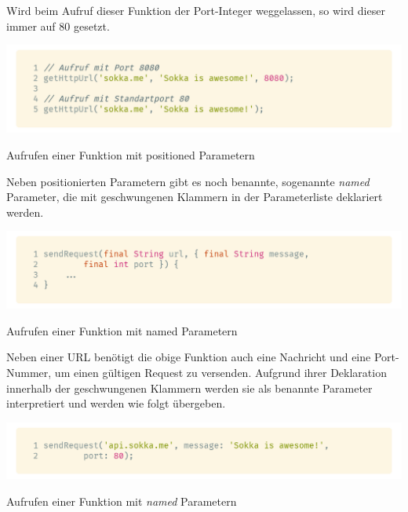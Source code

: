\newpage

Wird beim Aufruf dieser Funktion der Port-Integer weggelassen, so wird dieser immer auf 80 gesetzt.

\begin{code}
    \centering
    \includegraphics[width=1\textwidth]{images/Dart/theory/dartCallPositionedFunction.png}
    \vspace{-25pt}
    \caption{Aufrufen einer Funktion mit positioned Parametern}
\end{code}

Neben positionierten Parametern gibt es noch \glqq benannte\grqq , sogenannte \textit{named} Parameter, die mit geschwungenen Klammern in der Parameterliste deklariert werden.

\begin{code}[H]
    \centering
    \includegraphics[width=1\textwidth]{images/Dart/theory/dartNamedArguments.png}
    \vspace{-25pt}
    \caption{Aufrufen einer Funktion mit named Parametern}
\end{code}

Neben einer URL benötigt die obige Funktion auch eine Nachricht und eine Port-Nummer, um einen gültigen Request zu versenden. Aufgrund ihrer Deklaration innerhalb der geschwungenen Klammern
werden sie als benannte Parameter interpretiert und werden wie folgt übergeben.

\begin{code}[H]
    \centering
    \includegraphics[width=1\textwidth]{images/Dart/theory/dartCallNamedArguments.png}
    \vspace{-25pt}
    \caption{Aufrufen einer Funktion mit \textit{named} Parametern}
\end{code}

